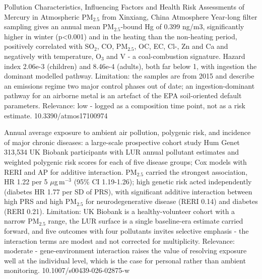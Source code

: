 \documentclass[10pt]{article}
\begin{document}
\par{}\baselineskip{}\baselineskip
{}

{Pollution Characteristics, Influencing Factors and Health Risk Assessments of Mercury in Atmospheric PM$_{2.5}$ from Xinxiang, China}
{Atmosphere}
{Year-long filter sampling gives an annual mean PM$_{2.5}$-bound Hg of 0.399 ng/m3, significantly higher in winter (p<0.001) and in the heating than the non-heating period, positively correlated with SO$_2$, CO, PM$_{2.5}$, OC, EC, Cl-, Zn and Ca and negatively with temperature, O$_3$ and V - a coal-combustion signature. Hazard index 2.06e-3 (children) and 8.46e-4 (adults), both far below 1, with ingestion the dominant modelled pathway. Limitation: the samples are from 2015 and describe an emissions regime two major control phases out of date; an ingestion-dominant pathway for an airborne metal is an artefact of the EPA soil-oriented default parameters. Relevance: low - logged as a composition time point, not as a risk estimate.}
{10.3390/atmos17100974}

\par{}\baselineskip{}\baselineskip
{}

{Annual average exposure to ambient air pollution, polygenic risk, and incidence of major chronic diseases: a large-scale prospective cohort study}
{Hum Genet}
{313,534 UK Biobank participants with LUR annual pollutant estimates and weighted polygenic risk scores for each of five disease groups; Cox models with RERI and AP for additive interaction. PM$_{2.5}$ carried the strongest association, HR 1.22 per 5 $\mu$g\,m$^{-3}$ (95\% CI 1.19-1.26); high genetic risk acted independently (diabetes HR 1.77 per SD of PRS), with significant additive interaction between high PRS and high PM$_{2.5}$ for neurodegenerative disease (RERI 0.14) and diabetes (RERI 0.21). Limitation: UK Biobank is a healthy-volunteer cohort with a narrow PM$_{2.5}$ range, the LUR surface is a single baseline-era estimate carried forward, and five outcomes with four pollutants invites selective emphasis - the interaction terms are modest and not corrected for multiplicity. Relevance: moderate - gene-environment interaction raises the value of resolving exposure well at the individual level, which is the case for personal rather than ambient monitoring.}
{10.1007/s00439-026-02875-w}
\end{document}
